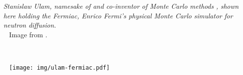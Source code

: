 \vfill
\begin{center}
\hfill
\begin{minipage}[b]{2in}
  \footnotesize {\it Stanislaw Ulam, namesake of \Stan and co-inventor
    of Monte Carlo methods \citep{MetropolisUlam:1949}, shown here
    holding the Fermiac, Enrico Fermi's physical Monte Carlo simulator
    for neutron diffusion.}
  \\[3pt] \mbox{ } \hfill
  {\scriptsize Image from \citep{Giesler:2000}.}
\end{minipage} \ \ \ \ \
\begin{minipage}[b]{1.5in} \mbox{ } \hfill
  \texttt{[image: img/ulam-fermiac.pdf]}
\end{minipage}
\end{center}
